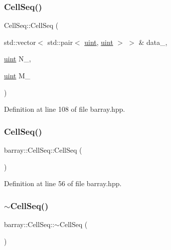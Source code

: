 \subsubsection{\texorpdfstring{Cell\+Seq()}{CellSeq()}\hspace{0.1cm}{\footnotesize\ttfamily [1/2]}}
{\footnotesize\ttfamily Cell\+Seq\+::\+Cell\+Seq (\begin{DoxyParamCaption}\item[{std\+::vector$<$ std\+::pair$<$ \hyperlink{namespacebarray_af9756a31953db233f80a9cfe1ef31c32}{uint}, \hyperlink{namespacebarray_af9756a31953db233f80a9cfe1ef31c32}{uint} $>$ $>$ \&}]{data\+\_\+,  }\item[{\hyperlink{namespacebarray_af9756a31953db233f80a9cfe1ef31c32}{uint}}]{N\+\_\+,  }\item[{\hyperlink{namespacebarray_af9756a31953db233f80a9cfe1ef31c32}{uint}}]{M\+\_\+ }\end{DoxyParamCaption})\hspace{0.3cm}{\ttfamily [inline]}}



Definition at line 108 of file barray.\+hpp.

\mbox{\label{classbarray_1_1_cell_seq_a985bcd1fd5c813965ab496f660e3243b}} 
\subsubsection{\texorpdfstring{Cell\+Seq()}{CellSeq()}\hspace{0.1cm}{\footnotesize\ttfamily [2/2]}}
{\footnotesize\ttfamily barray\+::\+Cell\+Seq\+::\+Cell\+Seq (\begin{DoxyParamCaption}{ }\end{DoxyParamCaption})\hspace{0.3cm}{\ttfamily [inline]}}



Definition at line 56 of file barray.\+hpp.

\mbox{\label{classbarray_1_1_cell_seq_a0841b94890087dd4199c7c561082e8dc}} 
\subsubsection{\texorpdfstring{$\sim$\+Cell\+Seq()}{~CellSeq()}}
{\footnotesize\ttfamily barray\+::\+Cell\+Seq\+::$\sim$\+Cell\+Seq (\begin{DoxyParamCaption}{ }\end{DoxyParamCaption})\hspace{0.3cm}{\ttfamily [inline]}}



